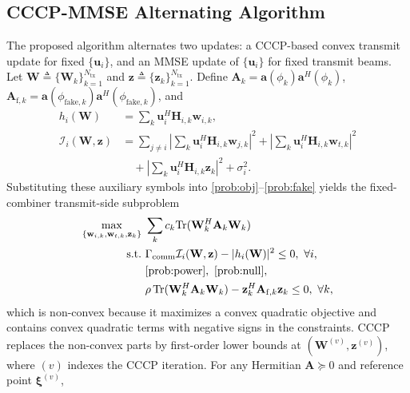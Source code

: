 \documentclass[lettersize,journal]{IEEEtran}
\begin{document}
\subsection{CCCP-MMSE Alternating Algorithm}
The proposed algorithm alternates two updates: a CCCP-based convex transmit update for fixed $\{\mathbf{u}_i\}$, and an MMSE update of $\{\mathbf{u}_i\}$ for fixed transmit beams. Let $\mathbf{W}\triangleq\{\mathbf{W}_k\}_{k=1}^{N_{\mathrm{tx}}}$ and $\mathbf{z}\triangleq\{\mathbf{z}_k\}_{k=1}^{N_{\mathrm{tx}}}$. Define $\mathbf{A}_k=\mathbf{a}(\phi_k)\mathbf{a}^H(\phi_k)$, $\mathbf{A}_{\mathrm{f},k}=\mathbf{a}(\phi_{\mathrm{fake},k})\mathbf{a}^H(\phi_{\mathrm{fake},k})$, and
\begin{equation}
    \begin{aligned}
    h_i(\mathbf{W})&={\textstyle\sum_k}\mathbf{u}_i^H\mathbf{H}_{i,k}\mathbf{w}_{i,k},\\
    \mathcal{I}_i(\mathbf{W},\mathbf{z})&={\textstyle\sum_{j\neq i}}\left|{\textstyle\sum_k}\mathbf{u}_i^H\mathbf{H}_{i,k}\mathbf{w}_{j,k}\right|^2
    +\left|{\textstyle\sum_k}\mathbf{u}_i^H\mathbf{H}_{i,k}\mathbf{w}_{t,k}\right|^2 \nonumber\\
    &\quad+\left|{\textstyle\sum_k}\mathbf{u}_i^H\mathbf{H}_{i,k}\mathbf{z}_k\right|^2+\sigma_i^2 .
    \end{aligned}
    \label{eq:auxiliary}
\end{equation}
Substituting these auxiliary symbols into \eqref{prob:obj}--\eqref{prob:fake} yields the fixed-combiner transmit-side subproblem
\begin{subequations}\label{eq:tx-orig}
\begin{align}
\max_{\{\mathbf{w}_{i,k},\mathbf{w}_{t,k},\mathbf{z}_k\}}\ & \sum_{k}c_k\mathrm{Tr}(\mathbf{W}_k^H\mathbf{A}_k\mathbf{W}_k)\\
\text{s.t.}\ & \Gamma_{\mathrm{comm}}\mathcal{I}_i(\mathbf{W},\mathbf{z})-|h_i(\mathbf{W})|^2\le 0,\ \forall i,\\
& \eqref{prob:power},\ \eqref{prob:null},\\
& \rho\,\mathrm{Tr}(\mathbf{W}_k^H\mathbf{A}_k\mathbf{W}_k)-\mathbf{z}_k^H\mathbf{A}_{\mathrm{f},k}\mathbf{z}_k\le 0,\ \forall k,
\end{align}
\end{subequations}
which is non-convex because it maximizes a convex quadratic objective and contains convex quadratic terms with negative signs in the constraints. CCCP replaces the non-convex parts by first-order lower bounds at $(\mathbf{W}^{(v)},\mathbf{z}^{(v)})$, where $(v)$ indexes the CCCP iteration. For any Hermitian $\mathbf{A}\succeq 0$ and reference point $\boldsymbol{\xi}^{(v)}$,
\end{document}
